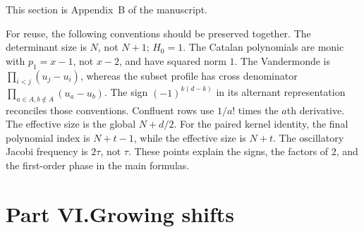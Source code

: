 \documentclass[11pt,a4paper]{article}
\numberwithin{equation}{section}
\theoremstyle{definition}
\theoremstyle{remark}
\begin{document}
This section is Appendix~B of the manuscript.

For reuse, the following conventions should be preserved together.
The determinant size is $N$, not $N+1$; $H_0=1$. The Catalan polynomials
are monic with $p_1=x-1$, not $x-2$, and have squared norm $1$.
The Vandermonde is $\prod_{i<j}(u_j-u_i)$, whereas the subset profile has
cross denominator $\prod_{a\in A,b\notin A}(u_a-u_b)$. The sign
$(-1)^{k(d-k)}$ in its alternant representation reconciles those
conventions. Confluent rows use $1/a!$ times the $a$th derivative. The
effective size is the global $N+d/2$. For the paired kernel identity,
the final polynomial index is $N+t-1$, while the effective size is
$N+t$. The oscillatory Jacobi frequency is $2\tau$, not $\tau$.
These points explain the signs, the factors of $2$, and the first-order
phase in the main formulas.

\setlength{\emergencystretch}{2em}%

\clearpage
{}\part*{Part VI.\quad Growing shifts}
\end{document}
